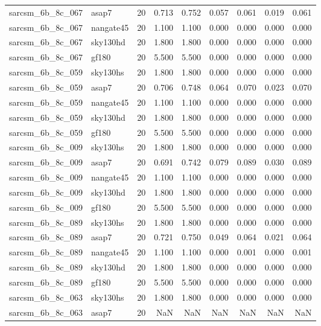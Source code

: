 \begin{tabular}{llrrrrrrr}
sarcsm\_6b\_8c\_067 & asap7 & 20 & 0.713 & 0.752 & 0.057 & 0.061 & 0.019 & 0.061 \\
sarcsm\_6b\_8c\_067 & nangate45 & 20 & 1.100 & 1.100 & 0.000 & 0.000 & 0.000 & 0.000 \\
sarcsm\_6b\_8c\_067 & sky130hd & 20 & 1.800 & 1.800 & 0.000 & 0.000 & 0.000 & 0.000 \\
sarcsm\_6b\_8c\_067 & gf180 & 20 & 5.500 & 5.500 & 0.000 & 0.000 & 0.000 & 0.000 \\
sarcsm\_6b\_8c\_059 & sky130hs & 20 & 1.800 & 1.800 & 0.000 & 0.000 & 0.000 & 0.000 \\
sarcsm\_6b\_8c\_059 & asap7 & 20 & 0.706 & 0.748 & 0.064 & 0.070 & 0.023 & 0.070 \\
sarcsm\_6b\_8c\_059 & nangate45 & 20 & 1.100 & 1.100 & 0.000 & 0.000 & 0.000 & 0.000 \\
sarcsm\_6b\_8c\_059 & sky130hd & 20 & 1.800 & 1.800 & 0.000 & 0.000 & 0.000 & 0.000 \\
sarcsm\_6b\_8c\_059 & gf180 & 20 & 5.500 & 5.500 & 0.000 & 0.000 & 0.000 & 0.000 \\
sarcsm\_6b\_8c\_009 & sky130hs & 20 & 1.800 & 1.800 & 0.000 & 0.000 & 0.000 & 0.000 \\
sarcsm\_6b\_8c\_009 & asap7 & 20 & 0.691 & 0.742 & 0.079 & 0.089 & 0.030 & 0.089 \\
sarcsm\_6b\_8c\_009 & nangate45 & 20 & 1.100 & 1.100 & 0.000 & 0.000 & 0.000 & 0.000 \\
sarcsm\_6b\_8c\_009 & sky130hd & 20 & 1.800 & 1.800 & 0.000 & 0.000 & 0.000 & 0.000 \\
sarcsm\_6b\_8c\_009 & gf180 & 20 & 5.500 & 5.500 & 0.000 & 0.000 & 0.000 & 0.000 \\
sarcsm\_6b\_8c\_089 & sky130hs & 20 & 1.800 & 1.800 & 0.000 & 0.000 & 0.000 & 0.000 \\
sarcsm\_6b\_8c\_089 & asap7 & 20 & 0.721 & 0.750 & 0.049 & 0.064 & 0.021 & 0.064 \\
sarcsm\_6b\_8c\_089 & nangate45 & 20 & 1.100 & 1.100 & 0.000 & 0.001 & 0.000 & 0.001 \\
sarcsm\_6b\_8c\_089 & sky130hd & 20 & 1.800 & 1.800 & 0.000 & 0.000 & 0.000 & 0.000 \\
sarcsm\_6b\_8c\_089 & gf180 & 20 & 5.500 & 5.500 & 0.000 & 0.000 & 0.000 & 0.000 \\
sarcsm\_6b\_8c\_063 & sky130hs & 20 & 1.800 & 1.800 & 0.000 & 0.000 & 0.000 & 0.000 \\
sarcsm\_6b\_8c\_063 & asap7 & 20 & NaN & NaN & NaN & NaN & NaN & NaN \\

\end{tabular}
